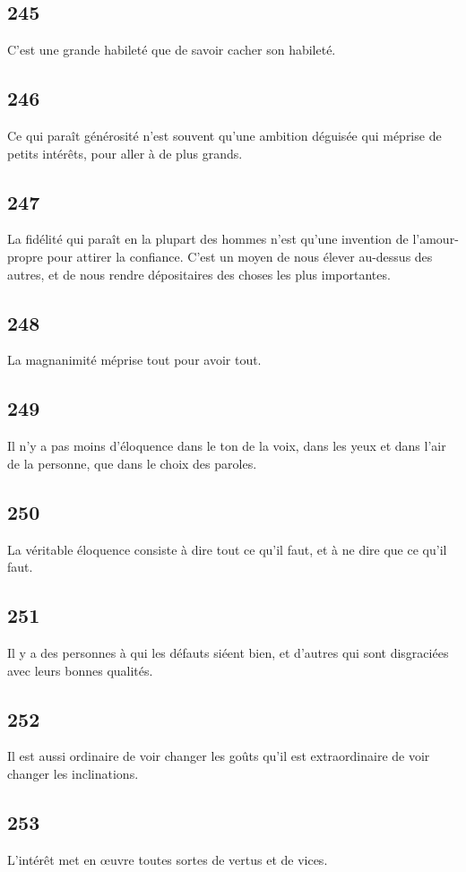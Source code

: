 \documentclass[french,twoside]{book} %
\begin{document}
\subsection[{245}]{ \textsc{245} }
\noindent C’est une grande habileté que de savoir cacher son habileté.
\subsection[{246}]{ \textsc{246} }
\noindent Ce qui paraît générosité n’est souvent qu’une ambition déguisée qui méprise de petits intérêts, pour aller à de plus grands.
\subsection[{247}]{ \textsc{247} }
\noindent La fidélité qui paraît en la plupart des hommes n’est qu’une invention de l’amour-propre pour attirer la confiance. C’est un moyen de nous élever au-dessus des autres, et de nous rendre dépositaires des choses les plus importantes.
\subsection[{248}]{ \textsc{248} }
\noindent La magnanimité méprise tout pour avoir tout.
\subsection[{249}]{ \textsc{249} }
\noindent Il n’y a pas moins d’éloquence dans le ton de la voix, dans les yeux et dans l’air de la personne, que dans le choix des paroles.
\subsection[{250}]{ \textsc{250} }
\noindent La véritable éloquence consiste à dire tout ce qu’il faut, et à ne dire que ce qu’il faut.
\subsection[{251}]{ \textsc{251} }
\noindent Il y a des personnes à qui les défauts siéent bien, et d’autres qui sont disgraciées avec leurs bonnes qualités.
\subsection[{252}]{ \textsc{252} }
\noindent Il est aussi ordinaire de voir changer les goûts qu’il est extraordinaire de voir changer les inclinations.
\subsection[{253}]{ \textsc{253} }
\noindent L’intérêt met en œuvre toutes sortes de vertus et de vices.
\end{document}
